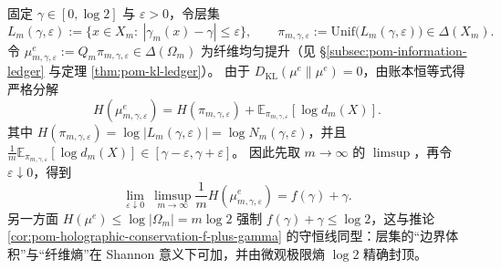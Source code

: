 \begin{remark}\label{rem:pom-layer-set-shannon-holography}
固定 \(\gamma\in[0,\log 2]\) 与 \(\varepsilon>0\)，令层集
\[
L_{m}(\gamma,\varepsilon):=\{x\in X_m:\ |\gamma_m(x)-\gamma|\le \varepsilon\},
\qquad
\pi_{m,\gamma,\varepsilon}:=\mathrm{Unif}\bigl(L_m(\gamma,\varepsilon)\bigr)\in\Delta(X_m).
\]
令 \(\mu^{e}_{m,\gamma,\varepsilon}:=Q_m\pi_{m,\gamma,\varepsilon}\in\Delta(\Omega_m)\) 为纤维均匀提升（见 \S\ref{subsec:pom-information-ledger} 与定理 \ref{thm:pom-kl-ledger}）。
由于 \(D_{\mathrm{KL}}(\mu^{e}\|\mu^{e})=0\)，由账本恒等式得严格分解
\[
H(\mu^{e}_{m,\gamma,\varepsilon})
=H(\pi_{m,\gamma,\varepsilon})+\mathbb{E}_{\pi_{m,\gamma,\varepsilon}}[\log d_m(X)].
\]
其中 \(H(\pi_{m,\gamma,\varepsilon})=\log|L_m(\gamma,\varepsilon)|=\log N_m(\gamma,\varepsilon)\)，并且
\(
\frac1m\mathbb{E}_{\pi_{m,\gamma,\varepsilon}}[\log d_m(X)]\in[\gamma-\varepsilon,\gamma+\varepsilon]
\)。
因此先取 \(m\to\infty\) 的 \(\limsup\)，再令 \(\varepsilon\downarrow 0\)，得到
\[
\lim_{\varepsilon\downarrow 0}\ \limsup_{m\to\infty}\frac{1}{m}H(\mu^{e}_{m,\gamma,\varepsilon})
=f(\gamma)+\gamma.
\]
另一方面 \(H(\mu^{e})\le \log|\Omega_m|=m\log 2\) 强制
\(
f(\gamma)+\gamma\le \log 2
\)，这与推论 \ref{cor:pom-holographic-conservation-f-plus-gamma} 的守恒线同型：层集的“边界体积”与“纤维熵”在 Shannon 意义下可加，并由微观极限熵 \(\log 2\) 精确封顶。
\end{remark}

